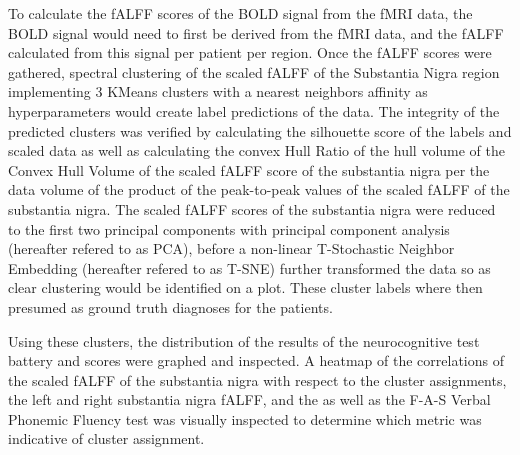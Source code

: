 \documentclass[12pt]{article}
\begin{document}
To calculate the fALFF scores of the BOLD signal from the fMRI data, the BOLD signal would need to first be derived from the fMRI data, and the fALFF calculated from this signal per patient per region. Once the fALFF scores were gathered, spectral clustering of the scaled fALFF of the Substantia Nigra region implementing 3 KMeans clusters with a nearest neighbors affinity as hyperparameters would create label predictions of the data. The integrity of the predicted clusters was verified by calculating the silhouette score of the labels and scaled data as well as calculating the convex Hull Ratio of the hull volume of the Convex Hull Volume of the scaled fALFF score of the substantia nigra per the data volume of the product of the peak-to-peak values of the scaled fALFF of the substantia nigra. The scaled fALFF scores of the substantia nigra were reduced to the first two principal components with principal component analysis (hereafter refered to as PCA), before a non-linear T-Stochastic Neighbor Embedding (hereafter refered to as T-SNE) further transformed the data so as clear clustering would be identified on a plot. These cluster labels where then presumed as ground truth diagnoses for the patients. 

Using these clusters, the distribution of the results of the neurocognitive test battery and scores were graphed and inspected. A heatmap of the correlations of the scaled fALFF of the substantia nigra with respect to the cluster assignments, the left and right substantia nigra fALFF, and the as well as the F-A-S Verbal Phonemic Fluency test was visually inspected to determine which metric was indicative of cluster assignment. 
\end{document}
